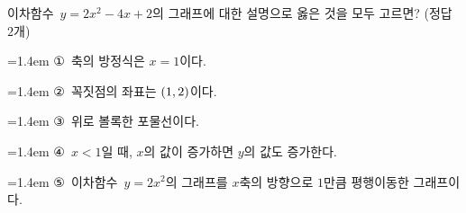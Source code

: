 이차함수~$y=2x^2-4x+2$의 그래프에 대한 설명으로 옳은 것을 모두 고르면? (정답 $2$개)
\par\medskip\par\noindent\hangindent=1.4em {\small ①}\ 축의 방정식은 $x=1$이다.\par\noindent\hangindent=1.4em {\small ②}\ 꼭짓점의 좌표는 $(1{,}\mkern3mu 2)$이다.\par\noindent\hangindent=1.4em {\small ③}\ 위로 볼록한 포물선이다.\par\noindent\hangindent=1.4em {\small ④}\ $x<1$일 때, $x$의 값이 증가하면 $y$의 값도 증가한다.\par\noindent\hangindent=1.4em {\small ⑤}\ 이차함수~$y=2x^2$의 그래프를 $x$축의 방향으로 $1$만큼 평행이동한 그래프이다.\par\medskip
